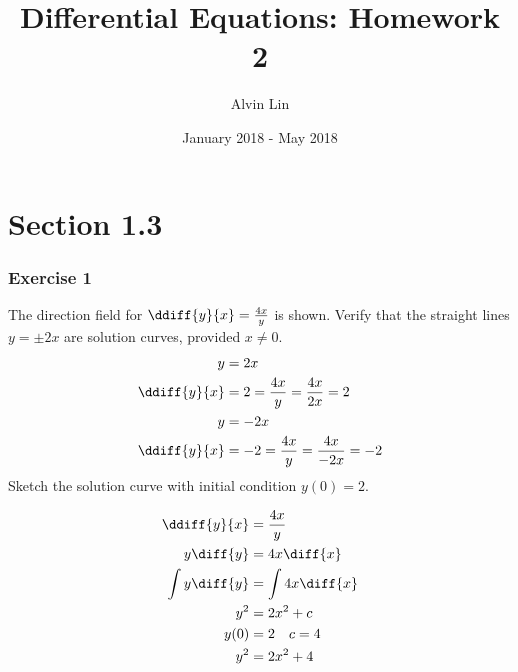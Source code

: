 \documentclass{math}
\title{Differential Equations: Homework 2}
\author{Alvin Lin}
\date{January 2018 - May 2018}
\begin{document}
\maketitle

\section*{Section 1.3}

\subsubsection*{Exercise 1}
The direction field for \( \ddiff{y}{x} = \frac{4x}{y} \) is shown.
Verify that the straight lines \( y = \pm2x \) are solution curves, provided
\( x \ne 0 \).
\begin{align*}
  y &= 2x \\
  \ddiff{y}{x} &= 2 = \frac{4x}{y} = \frac{4x}{2x} = 2 \\
  y &= -2x \\
  \ddiff{y}{x} &= -2 = \frac{4x}{y} = \frac{4x}{-2x} = -2
\end{align*}
Sketch the solution curve with initial condition \( y(0) = 2 \). \\[1cm]
\begin{minipage}[class]{7cm}
  \begin{align*}
    \ddiff{y}{x} &= \frac{4x}{y} \\
    y\diff{y} &= 4x\diff{x} \\
    \int y\diff{y} &= \int 4x\diff{x} \\
    y^2 &= 2x^2+c \\
    y(0) &= 2 \quad c = 4 \\
    y^2 &= 2x^2+4
  \end{align*}
\end{minipage}
\begin{minipage}[c]{8cm}
\end{minipage}
\clearpage
\end{document}
